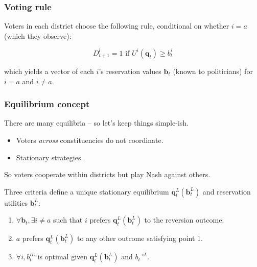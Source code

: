 \documentclass[11pt,aspectratio=169]{beamer}
\begin{document}
\begin{frame}
\frametitle{Voting rule}

\noindent Voters in each district choose the following rule, conditional on whether $i=a$ (which they observe): 

$$D^l_{t+1} = 1 \text{ if } U^i(\textbf{q}_t) \geq b_t^i$$ 

which yields a vector of each $i$'s reservation values $\textbf{b}_t$ (known to politicians) for $i = a$ and $i \neq a$.



\end{frame}

\begin{frame}
\frametitle{Equilibrium concept}

\noindent There are many equilibria -- so let's keep things simple-ish.

\begin{itemize}
\item Voters \textit{across} constituencies do not coordinate.

\item Stationary strategies.%
\end{itemize}

So voters cooperate within districts but play Nash against others.

\medskip

\noindent Three criteria define a unique stationary equilibrium $\textbf{q}^L_t(\textbf{b}^L_t)$ and reservation utilities $\textbf{b}^L_t$:

\begin{enumerate}
\item $\forall \textbf{b}_t, \exists i \neq a$ such that $i$ prefers $\textbf{q}^L_t(\textbf{b}^L_t)$ to the reversion outcome.

\item $a$ prefers $\textbf{q}^L_t(\textbf{b}^L_t)$ to any other outcome satisfying point 1.

\item $\forall i, b_t^{iL}$ is optimal given $\textbf{q}^L_t(\textbf{b}^L_t)$ and $b_t^{-iL}$.
\end{enumerate}


\end{frame}
\end{document}
